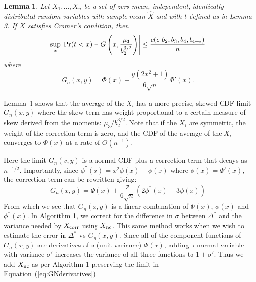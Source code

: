 \documentclass[twoside]{article} \usepackage{aistats2017}
\newtheorem{lemma}{Lemma}
\begin{document}
\begin{lemma}\label{lem:clt_edgeworth}
Let $X_1,\ldots,X_n$ be a set of zero-mean, independent, identically-distributed
random variables with sample mean $\hat{X}$ and with $t$ defined as in Lemma 3.
If $X$ satisfies Cramer's condition, then
\[
    \sup_x\left|{\rm Pr}(t<x) - G\left(x, \frac{\mu_3}{b_2^{3/2}}\right)\right| \leq \frac{c(\epsilon,b_2,b_3,b_4,b_{4+\epsilon})}{n}
\]
where
\begin{equation}
    G_n(x,y) = \Phi(x) + \frac{y(2x^2+1)}{6\sqrt{n}}\Phi'(x).
\end{equation}
\end{lemma}
Lemma~\ref{lem:clt_edgeworth} shows that the average of the $X_i$ has a more
precise, skewed CDF limit $G_n(x,y)$ where the skew term has weight proportional
to a certain measure of skew derived from the moments:
$\mu_3/b_2^{3/2}$. Note that if the $X_i$ are symmetric, the weight of
the correction term is zero, and the CDF of the average of the $X_i$ converges
to $\Phi(x)$ at a rate of $O(n^{-1})$.

Here the limit $G_n(x,y)$ is a normal CDF plus a correction term that decays as
$n^{-1/2}$.
Importantly, since $\phi^{''}(x) = x^2\phi(x) - \phi(x)$ where
$\phi(x)=\Phi'(x)$, the correction term can be rewritten giving:
\begin{equation}\label{eq:GNderivatives}
    G_n(x,y) = \Phi(x) + \frac{y}{6\sqrt{n}}(2\phi^{''}(x)+3\phi(x))
\end{equation}
From which we see that $G_n(x,y)$ is a linear combination of $\Phi(x)$,
$\phi(x)$ and $\phi^{''}(x)$. In Algorithm 1, we
correct for the difference in $\sigma$ between $\Delta^*$ and the variance
needed by $X_{\rm corr}$ using $X_{\rm nc}$. This same method works when we
wish to estimate the error in $\Delta^*$ vs $G_n(x,y)$. Since all of the
component functions of $G_n(x,y)$ are derivatives of a (unit variance)
$\Phi(x)$, adding a normal variable with variance $\sigma'$ increases the
variance of all three functions to $1+\sigma'$. Thus we add $X_{\rm nc}$ as
per Algorithm 1 preserving the limit in Equation~(\ref{eq:GNderivatives}).
\end{document}
